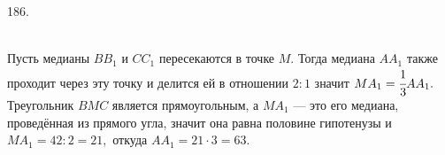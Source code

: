 186. \begin{figure}[ht!]
\end{figure}\\
Пусть медианы $BB_1$ и $CC_1$ пересекаются в точке $M.$ Тогда медиана $AA_1$ также проходит через эту точку и делится ей в отношении $2:1$ значит $MA_1=\cfrac{1}{3}AA_1.$ Треугольник $BMC$ является прямоугольным, а $MA_1$ --- это его медиана, проведённая из прямого угла, значит она равна половине гипотенузы и $MA_1=42:2=21,$ откуда $AA_1=21\cdot3=63.$\\
